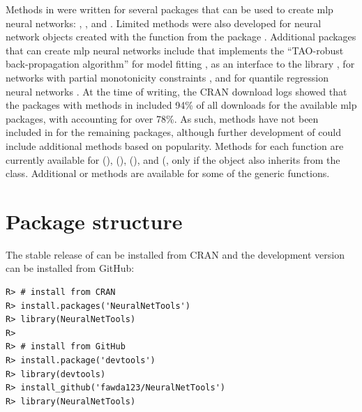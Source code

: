\documentclass[article,shortnames]{jss}\usepackage[]{graphicx}\usepackage[]{color}
\makeatletter
\newenvironment{kframe}{%
 \def\at@end@of@kframe{}%
 \ifinner\ifhmode%
  \def\at@end@of@kframe{\end{minipage}}%
  \begin{minipage}{\columnwidth}%
 \fi\fi%
 \def\FrameCommand##1{\hskip\@totalleftmargin \hskip-\fboxsep
 \colorbox{shadecolor}{##1}\hskip-\fboxsep
     \hskip-\linewidth \hskip-\@totalleftmargin \hskip\columnwidth}%
 \MakeFramed {\advance\hsize-\width
   \@totalleftmargin\z@ \linewidth\hsize
   \@setminipage}}%
 {\par\unskip\endMakeFramed%
 \at@end@of@kframe}
\newenvironment{knitrout}{}{} %
\makeatother
\begin{document}
Methods in  were written for several  packages that can be used to create \ac{mlp} neural networks:  \citep{Fritsch12},  \citep{Venables02}, and  \citep{Bergmeir12}. Limited methods were also developed for neural network objects created with the  function from the  package \citep{Kuhn15}.  Additional  packages that can create \ac{mlp} neural networks include  that implements the ``TAO-robust back-propagation algorithm'' for model fitting \citep{Castejon14},  as an  interface to the   library \citep{Klima15},  for networks with partial monotonicity constraints \citep{Cannon15}, and  for quantile regression neural networks \citep{Cannon11}.  At the time of writing, the \ac{CRAN} download logs \citep{Csardi15} showed that the  packages with methods in  included 94\% of all downloads for the available \ac{mlp} packages, with  accounting for over 78\%.  As such, methods have not been included in  for the remaining packages, although further development of  could include additional methods based on popularity.  Methods for each function are currently available for   (),  (),  (), and  (, only if the object also inherits from the  class.  Additional  or  methods are available for some of the generic functions.

\section[Package structure]{Package structure}

The stable release of  can be installed from \ac{CRAN} and the development version can be installed from GitHub:

\begin{knitrout}
\color{fgcolor}\begin{kframe}
\begin{verbatim}
R> # install from CRAN
R> install.packages('NeuralNetTools')
R> library(NeuralNetTools)
R> 
R> # install from GitHub
R> install.package('devtools')
R> library(devtools)
R> install_github('fawda123/NeuralNetTools')
R> library(NeuralNetTools)
\end{verbatim}
\end{kframe}
\end{knitrout}
\end{document}
